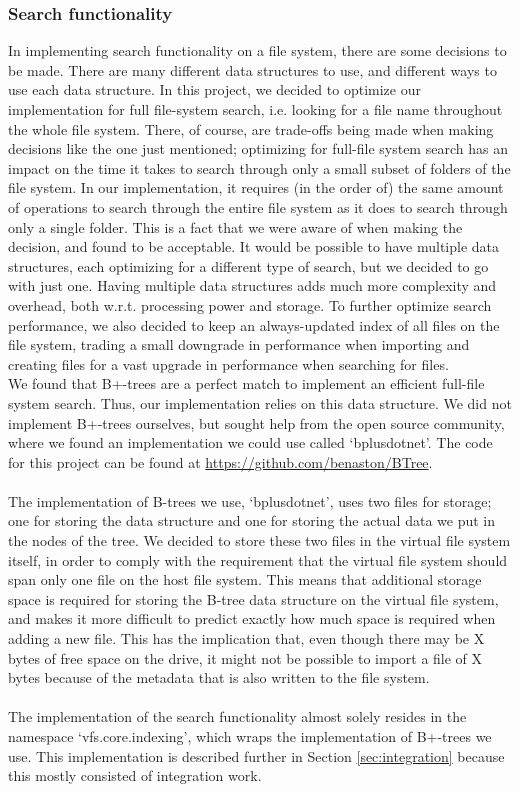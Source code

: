 \documentclass[a4paper,12pt]{article}
\begin{document}
\subsubsection{Search functionality}
\label{sec:search_functionality}
In implementing search functionality on a file system, there are some decisions to be made. There are many different data structures to use, and different ways to use each data structure. In this project, we decided to optimize our implementation for full file-system search, i.e. looking for a file name throughout the whole file system. There, of course, are trade-offs being made when making decisions like the one just mentioned; optimizing for full-file system search has an impact on the time it takes to search through only a small subset of folders of the file system. In our implementation, it requires (in the order of) the same amount of operations to search through the entire file system as it does to search through only a single folder. This is a fact that we were aware of when making the decision, and found to be acceptable. It would be possible to have multiple data structures, each optimizing for a different type of search, but we decided to go with just one. Having multiple data structures adds much more complexity and overhead, both w.r.t. processing power and storage. To further optimize search performance, we also decided to keep an always-updated index of all files on the file system, trading a small downgrade in performance when importing and creating files for a vast upgrade in performance when searching for files.\\
We found that B+-trees are a perfect match to implement an efficient full-file system search. Thus, our implementation relies on this data structure. We did not implement B+-trees ourselves, but sought help from the open source community, where we found an implementation we could use called `bplusdotnet'. The code for this project can be found at \url{https://github.com/benaston/BTree}.\\
\\
The implementation of B-trees we use, `bplusdotnet', uses two files for storage; one for storing the data structure and one for storing the actual data we put in the nodes of the tree. We decided to store these two files in the virtual file system itself, in order to comply with the requirement that the virtual file system should span only one file on the host file system. This means that additional storage space is required for storing the B-tree data structure on the virtual file system, and makes it more difficult to predict exactly how much space is required when adding a new file. This has the implication that, even though there may be X bytes of free space on the drive, it might not be possible to import a file of X bytes because of the metadata that is also written to the file system.\\
\\
The implementation of the search functionality almost solely resides in the namespace `vfs.core.indexing', which wraps the implementation of B+-trees we use. This implementation is described further in Section \ref{sec:integration} because this mostly consisted of integration work.
\end{document}
